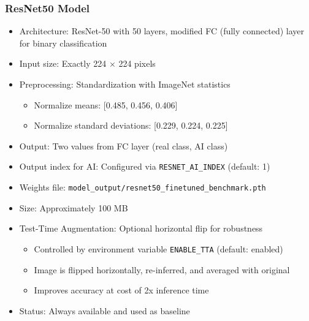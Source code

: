 \documentclass[12pt,a4paper]{book}
\begin{document}
\subsubsection{ResNet50 Model}
\begin{itemize}
    \item Architecture: ResNet-50 with 50 layers, modified FC (fully connected) layer for binary classification
    \item Input size: Exactly 224 × 224 pixels
    \item Preprocessing: Standardization with ImageNet statistics
    \begin{itemize}
        \item Normalize means: [0.485, 0.456, 0.406]
        \item Normalize standard deviations: [0.229, 0.224, 0.225]
    \end{itemize}
    \item Output: Two values from FC layer (real class, AI class)
    \item Output index for AI: Configured via \texttt{RESNET\_AI\_INDEX} (default: 1)
    \item Weights file: \texttt{model\_output/resnet50\_finetuned\_benchmark.pth}
    \item Size: Approximately 100 MB
    \item Test-Time Augmentation: Optional horizontal flip for robustness
    \begin{itemize}
        \item Controlled by environment variable \texttt{ENABLE\_TTA} (default: enabled)
        \item Image is flipped horizontally, re-inferred, and averaged with original
        \item Improves accuracy at cost of 2x inference time
    \end{itemize}
    \item Status: Always available and used as baseline
\end{itemize}
\end{document}
